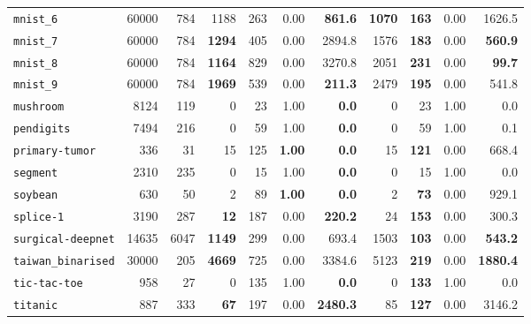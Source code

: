 \begin{tabular}{lccrrrrrrrr}
\texttt{mnist\_6} & \multicolumn{1}{r}{60000} & \multicolumn{1}{r}{784}  & 1188 & 263 & 0.00 & \textbf{861.6} & \textbf{1070} & \textbf{163} & 0.00 & 1626.5\\
\texttt{mnist\_7} & \multicolumn{1}{r}{60000} & \multicolumn{1}{r}{784}  & \textbf{1294} & 405 & 0.00 & 2894.8 & 1576 & \textbf{183} & 0.00 & \textbf{560.9}\\
\texttt{mnist\_8} & \multicolumn{1}{r}{60000} & \multicolumn{1}{r}{784}  & \textbf{1164} & 829 & 0.00 & 3270.8 & 2051 & \textbf{231} & 0.00 & \textbf{99.7}\\
\texttt{mnist\_9} & \multicolumn{1}{r}{60000} & \multicolumn{1}{r}{784}  & \textbf{1969} & 539 & 0.00 & \textbf{211.3} & 2479 & \textbf{195} & 0.00 & 541.8\\
\texttt{mushroom} & \multicolumn{1}{r}{8124} & \multicolumn{1}{r}{119}  & 0 & 23 & 1.00 & \textbf{0.0} & 0 & 23 & 1.00 & 0.0\\
\texttt{pendigits} & \multicolumn{1}{r}{7494} & \multicolumn{1}{r}{216}  & 0 & 59 & 1.00 & \textbf{0.0} & 0 & 59 & 1.00 & 0.1\\
\texttt{primary-tumor} & \multicolumn{1}{r}{336} & \multicolumn{1}{r}{31}  & 15 & 125 & \textbf{1.00} & \textbf{0.0} & 15 & \textbf{121} & 0.00 & 668.4\\
\texttt{segment} & \multicolumn{1}{r}{2310} & \multicolumn{1}{r}{235}  & 0 & 15 & 1.00 & \textbf{0.0} & 0 & 15 & 1.00 & 0.0\\
\texttt{soybean} & \multicolumn{1}{r}{630} & \multicolumn{1}{r}{50}  & 2 & 89 & \textbf{1.00} & \textbf{0.0} & 2 & \textbf{73} & 0.00 & 929.1\\
\texttt{splice-1} & \multicolumn{1}{r}{3190} & \multicolumn{1}{r}{287}  & \textbf{12} & 187 & 0.00 & \textbf{220.2} & 24 & \textbf{153} & 0.00 & 300.3\\
\texttt{surgical-deepnet} & \multicolumn{1}{r}{14635} & \multicolumn{1}{r}{6047}  & \textbf{1149} & 299 & 0.00 & 693.4 & 1503 & \textbf{103} & 0.00 & \textbf{543.2}\\
\texttt{taiwan\_binarised} & \multicolumn{1}{r}{30000} & \multicolumn{1}{r}{205}  & \textbf{4669} & 725 & 0.00 & 3384.6 & 5123 & \textbf{219} & 0.00 & \textbf{1880.4}\\
\texttt{tic-tac-toe} & \multicolumn{1}{r}{958} & \multicolumn{1}{r}{27}  & 0 & 135 & 1.00 & \textbf{0.0} & 0 & \textbf{133} & 1.00 & 0.0\\
\texttt{titanic} & \multicolumn{1}{r}{887} & \multicolumn{1}{r}{333}  & \textbf{67} & 197 & 0.00 & \textbf{2480.3} & 85 & \textbf{127} & 0.00 & 3146.2\\

\end{tabular}
